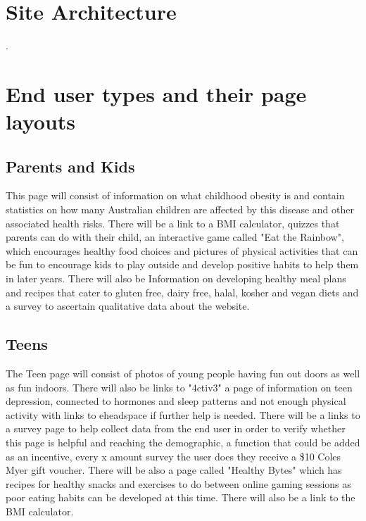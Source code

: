 \documentclass[letterpaper,12pt]{article}
\begin{document}
\section{Site Architecture}

.


\section{End user types and their page layouts}
\subsection{Parents and Kids}

This page will consist of information on what childhood obesity is and contain statistics on how many Australian children are affected by this disease and other associated health risks. There will be a link to a BMI calculator, quizzes that parents can do with their child, an interactive game called "Eat the Rainbow", which encourages healthy food choices and pictures of physical activities that can be fun to encourage kids to play outside and develop positive habits to help them in later years. There will also be Information on developing healthy meal plans and recipes that cater to gluten free, dairy free, halal, kosher and vegan diets and a survey to ascertain qualitative data about the website.

\subsection{Teens}

The Teen page will consist of photos of young people having fun out doors as well as fun indoors. There will also be links to "4ctiv3" a page of information on teen depression, connected to hormones and sleep patterns and not enough physical activity with links to eheadspace if further help is needed. There will be a links to a survey page to help collect data from the end user in order to verify whether this page is helpful and reaching the demographic, a function that could be added as an incentive, every x amount survey the user does they receive a \$10 Coles Myer gift voucher. There will be also a page called "Healthy Bytes" which has recipes for healthy snacks and exercises to do between online gaming sessions as poor eating habits can be developed at this time. There will also be a link to the BMI calculator.
\end{document}
